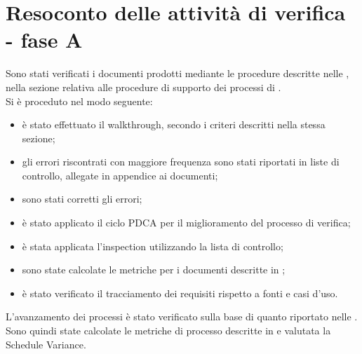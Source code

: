 \section{Resoconto delle attività di verifica - fase A}
Sono stati verificati i documenti prodotti mediante le procedure descritte nelle \NormeDiProgetto, nella sezione relativa alle procedure di supporto dei processi di \VV.\\
Si è proceduto nel modo seguente:\begin{itemize}
	\item è stato effettuato il walkthrough, secondo i criteri descritti nella stessa sezione;
	\item gli errori riscontrati con maggiore frequenza sono stati riportati in liste di controllo, allegate in appendice ai documenti;
	\item sono stati corretti gli errori;
	\item è stato applicato il ciclo PDCA per il miglioramento del processo di verifica;
	\item è stata applicata l'inspection utilizzando la lista di controllo;
	\item sono state calcolate le metriche per i documenti descritte in ;
	\item è stato verificato il tracciamento dei requisiti rispetto a fonti e casi d'uso.
\end{itemize}
L'avanzamento dei processi è stato verificato sulla base di quanto riportato nelle \NormeDiProgetto. Sono quindi state calcolate le metriche di processo descritte in  e valutata la Schedule Variance.
